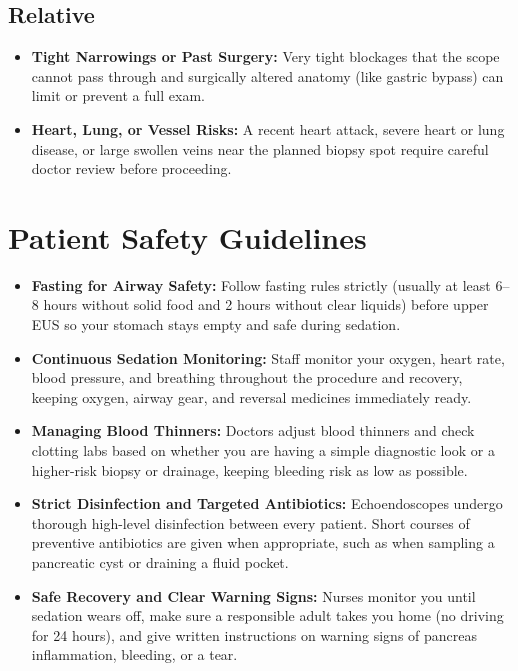 \subsection{Relative}

\begin{itemize}
    \item \textbf{Tight Narrowings or Past Surgery:} Very tight blockages that the scope cannot pass through and surgically altered anatomy (like gastric bypass) can limit or prevent a full exam.
    \item \textbf{Heart, Lung, or Vessel Risks:} A recent heart attack, severe heart or lung disease, or large swollen veins near the planned biopsy spot require careful doctor review before proceeding.
\end{itemize}

\section{Patient Safety Guidelines}

\begin{itemize}
    \item \textbf{Fasting for Airway Safety:} Follow fasting rules strictly (usually at least 6--8 hours without solid food and 2 hours without clear liquids) before upper EUS so your stomach stays empty and safe during sedation.
    \item \textbf{Continuous Sedation Monitoring:} Staff monitor your oxygen, heart rate, blood pressure, and breathing throughout the procedure and recovery, keeping oxygen, airway gear, and reversal medicines immediately ready.
    \item \textbf{Managing Blood Thinners:} Doctors adjust blood thinners and check clotting labs based on whether you are having a simple diagnostic look or a higher-risk biopsy or drainage, keeping bleeding risk as low as possible.
    \item \textbf{Strict Disinfection and Targeted Antibiotics:} Echoendoscopes undergo thorough high-level disinfection between every patient. Short courses of preventive antibiotics are given when appropriate, such as when sampling a pancreatic cyst or draining a fluid pocket.
    \item \textbf{Safe Recovery and Clear Warning Signs:} Nurses monitor you until sedation wears off, make sure a responsible adult takes you home (no driving for 24 hours), and give written instructions on warning signs of pancreas inflammation, bleeding, or a tear.
\end{itemize}

